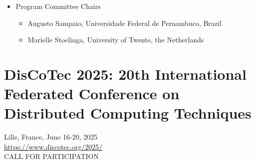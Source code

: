\documentclass[prodmode,acmtecs]{acmsmall} %
\begin{document}
\begin{itemize}
\item  Program Committee Chairs 
 
\begin{itemize}\item  Augusto Sampaio, Universidade Federal de Pernambuco, Brazil
\item  Marielle Stoelinga, University of Twente, the Netherlands
\end{itemize} 
\end{itemize}\section{DisCoTec 2025: 20th International Federated Conference on Distributed Computing Techniques}\label{DisCoTec2025}  Lille, France, June 16-20, 2025\\ 
  \href{https://www.discotec.org/2025/}{https://www.discotec.org/2025/}\\ 
CALL FOR PARTICIPATION 
\end{document}
